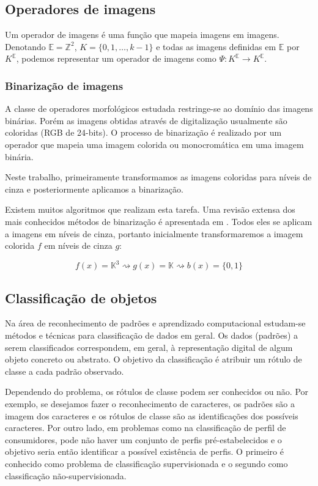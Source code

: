 \documentclass[a4paper,11pt]{article}
\begin{document}
\subsection{Operadores de imagens}
Um operador de imagens é uma função que mapeia imagens em
imagens. Denotando $\mathbb{E}=\mathbb{Z}^2$, $K=\{0,1,\ldots,k-1\}$ e
todas as imagens definidas em $\mathbb{E}$ por $K^{\mathbb{E}}$,
  podemos representar um operador de imagens como $\Psi: K^{\mathbb{E}}
    \to K^{\mathbb{E}}$.

\subsubsection{Binarização de imagens}

A classe de operadores morfológicos estudada restringe-se ao domínio das imagens binárias. Porém as imagens obtidas através de digitalização usualmente são coloridas (RGB de 24-bits). O processo de binarização é realizado por um operador que mapeia uma imagem colorida ou monocromática em uma imagem binária.

Neste trabalho, primeiramente transformamos as imagens coloridas para níveis de cinza e posteriormente aplicamos a binarização.

Existem muitos algoritmos que realizam esta tarefa. Uma revisão extensa dos mais conhecidos métodos de binarização é apresentada em \cite{citeulike:890354}. Todos eles se aplicam a imagens em níveis de cinza, portanto inicialmente transformaremos a imagem colorida $f$ em níveis de cinza $g$:

\begin{equation}
  f(x) = \mathbb{K}^3 \rightsquigarrow g(x) = \mathbb{K} \rightsquigarrow b(x) = \{0, 1\}
\end{equation}

\subsection{Classificação de objetos}

Na área de reconhecimento de padrões e aprendizado computacional
estudam-se métodos e técnicas para classificação de dados em geral. Os
dados (padrões) a serem classificados correspondem, em geral, à
representação digital de algum objeto concreto ou abstrato. O objetivo
da classificação é atribuir um rótulo de classe a cada padrão
observado.

Dependendo do problema, os rótulos de classe podem ser conhecidos ou
não. Por exemplo, se desejamos fazer o reconhecimento de caracteres,
os padrões são a imagem dos caracteres e os rótulos de classe são as
identificações dos possíveis caracteres. Por outro lado, em problemas
como na classificação de perfil de consumidores, pode não haver um
conjunto de perfis pré-estabelecidos e o objetivo seria então
identificar a possível existência de perfis. O primeiro é conhecido
como problema de classificação supervisionada e o segundo como
classificação não-supervisionada.
\end{document}
